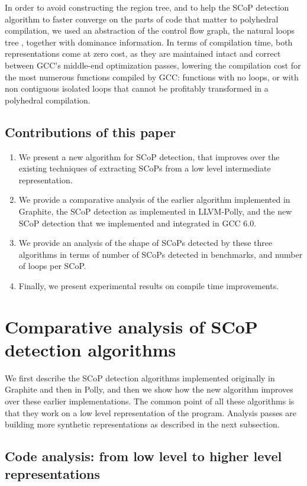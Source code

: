 \documentclass{sigplanconf}
\begin{document}
In order to avoid constructing the region tree, and to help the SCoP detection
algorithm to faster converge on the parts of code that matter to polyhedral
compilation, we used an abstraction of the control flow graph, the natural loops
tree \cite{dragonbook}, together with dominance information.  In terms of
compilation time, both representations come at zero cost, as they are maintained
intact and correct between GCC's middle-end optimization passes, lowering the
compilation cost for the most numerous functions compiled by GCC: functions with
no loops, or with non contiguous isolated loops that cannot be profitably
transformed in a polyhedral compilation.

\subsection{Contributions of this paper}
\begin{enumerate}
  \item We present a new algorithm for SCoP detection, that improves over the
    existing techniques of extracting SCoPs from a low level intermediate
    representation.
  \item We provide a comparative analysis of the earlier algorithm implemented
    in Graphite, the SCoP detection as implemented in LLVM-Polly, and the new
    SCoP detection that we implemented and integrated in GCC 6.0.
  \item We provide an analysis of the shape of SCoPs detected by these three
    algorithms in terms of number of SCoPs detected in benchmarks, and number of
    loops per SCoP.
  \item Finally, we present experimental results on compile time improvements.
\end{enumerate}

\newpage
\section{Comparative analysis of SCoP detection algorithms}

We first describe the SCoP detection algorithms implemented originally in
Graphite and then in Polly, and then we show how the new algorithm improves over
these earlier implementations.  The common point of all these algorithms is that
they work on a low level representation of the program.  Analysis passes are
building more synthetic representations as described in the next subsection.

\subsection{Code analysis: from low level to higher level representations}
\end{document}
